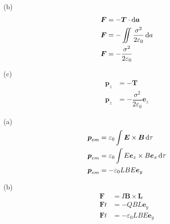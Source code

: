 (b)\begin{align*}
    \boldsymbol{F}&=-\boldsymbol{T}\cdot\dif\boldsymbol{a}\\
    \boldsymbol{F}&=-\iint\dfrac{\sigma^2}{2\varepsilon_0}\dif{a}\\
    \boldsymbol{F}&=-\dfrac{\sigma^2}{2\varepsilon_0}
\end{align*}

(c)\begin{align*}
    \boldsymbol{p}_z&=-\boldsymbol{T}\\
    \boldsymbol{p}_z&=-\dfrac{\sigma^2}{2\varepsilon_0}\boldsymbol{e}_z
\end{align*}

(a)\begin{align*}
    \boldsymbol{p}_{em}&=\varepsilon_0\int\boldsymbol{E}\times\boldsymbol{B}\dif\tau\\
    \boldsymbol{p}_{em}&=\varepsilon_0\int E\boldsymbol{e}_z\times B\boldsymbol{e}_x\dif\tau\\
\boldsymbol{p}_{em}&=-\varepsilon_0LBE\boldsymbol{e}_y
\end{align*}

(b)\begin{align*}
    \boldsymbol{F}&=I\boldsymbol{B}\times\boldsymbol{L}\\
    \boldsymbol{F}t&=-QBL\boldsymbol{e}_y\\
    \boldsymbol{F}t&=-\varepsilon_0LBE\boldsymbol{e}_y
\end{align*}

